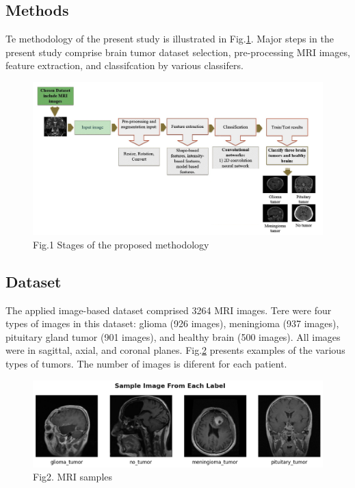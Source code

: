 \documentclass[12pt]{article}
\begin{document}
	\subsection{Methods}
	Te methodology of the present study is illustrated in Fig.\ref{fig:Methodology}. Major steps in the present study comprise brain tumor dataset selection, pre-processing MRI images, feature extraction, and classifcation by various classifers.
	
\begin{figure}[H]
\includegraphics[width=1\textwidth]{Figs/methodology}
\caption{Fig.1 Stages of the proposed methodology}
\label{fig:Methodology}
\end{figure}

	\subsection{Dataset}
	The applied image-based dataset comprised 3264  MRI images.
Tere were four types of images in this dataset: glioma (926 images), meningioma (937 images), pituitary gland tumor (901 images), and healthy brain (500 images). All
images were in sagittal, axial, and coronal planes. Fig.\ref{fig:Dataset} presents examples of the various types of tumors. The number of images is diferent for each patient.


\begin{figure}[H]
\includegraphics[width=1\textwidth]{Figs/output.png}
\caption{Fig2. MRI samples}
\label{fig:Dataset}
\end{figure}
	
\end{document}
